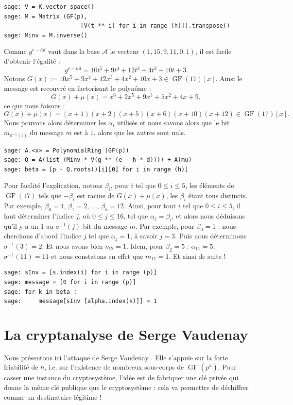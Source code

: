 \documentclass[a4paper, titlepage, 11pt]{article}
\theoremstyle{definition}
\theoremstyle{remark}
\def\gf{\operatorname{GF}}
\begin{document}
\begin{verbatim}
sage: V = K.vector_space()
sage: M = Matrix (GF(p), 
                      [V(t ** i) for i in range (h)]).transpose()
sage: Minv = M.inverse()
\end{verbatim}
Comme $g^{e - hd}$ vaut dans la base $\mathcal{A}$ le vecteur $(1, 15, 9, 11, 0, 1)$, il est facile d'obtenir l'égalité : 
$$g^{e - hd} = 10t^5 + 9t^4 + 12t^3 + 4t^2 + 10t + 3.$$
Notons $G(x) := 10x^5 + 9x^4 + 12x^3 + 4x^2 + 10x + 3 \in \gf(17)[x]$.
Ainsi le message est recouvré en factorisant le polynôme :
$$G(x) + \mu(x) = x^6 + 2x^5 + 9x^3 + 5x^2 + 4x + 9,$$
ce que nous faisons : 
$$G(x) + \mu(x) = (x + 1)(x + 2)(x + 5)(x + 6)(x + 10)(x + 12)\in \gf(17)[x].$$ 
Nous pouvons alors déterminer les $\alpha_i$ utilisés et nous savons alors que le bit $m_{\sigma^{-1}(i)}$ du message $m$ est à $1$, alors que les autres sont nuls.
\begin{verbatim}
sage: A.<x> = PolynomialRing (GF(p))
sage: Q = A(list (Minv * V(g ** (e - h * d)))) + A(mu)
sage: beta = [p - Q.roots()[i][0] for i in range (h)]
\end{verbatim}
Pour facilité l'explication, notons $\beta_i$, pour $i$ tel que $0\leqslant i \leqslant 5$, les éléments de $\gf(17)$ tels que $-\beta_i$ est racine de $G(x) + \mu(x)$, les $\beta_i$ étant tous distincts. Par exemple, $\beta_0 = 1$, $\beta_1 =2$, $\dots$, $\beta_5 = 12$. Ainsi, pour tout $i$ tel que $0\leqslant i \leqslant 5$, il faut déterminer l'indice $j$, où $0 \leqslant j \leqslant 16$, tel que $\alpha_j = \beta_i$, et alors nous déduisons qu'il y a un $1$ au $\sigma^{-1}(j)$ bit du message $m$.
Par exemple, pour $\beta_0 = 1$ : nous cherchons d'abord l'indice $j$ tel que $\alpha_j = 1$, à savoir $j = 3$. Puis nous déterminons $\sigma^{-1}(3) = 2$. Et nous avons bien $m_2 = 1$. Idem, pour $\beta_2 = 5$ : $\alpha_{11} = 5$, $\sigma^{-1}(11) = 11$ et nous constatons en effet que $m_{11} = 1$. Et ainsi de suite !
\begin{verbatim}
sage: sInv = [s.index(i) for i in range (p)]
sage: message = [0 for i in range (p)]
sage: for k in beta :
sage:     message[sInv [alpha.index(k)]] = 1
\end{verbatim}

\section{La cryptanalyse de Serge Vaudenay}\label{sec:cryptanalyse}

Nous présentons ici l'attaque de Serge Vaudenay \cite{vaudenay2000}. Elle s'appuie sur la forte friabilité de $h$, i.e. sur l'existence de nombreux sous-corps de $\gf(p^h)$. Pour casser une instance du cryptosystème, l'idée est de fabriquer une clé privée qui donne la même clé publique que le cryptosystème : cela va permettre de déchiffrer comme un destinataire légitime !
\end{document}
